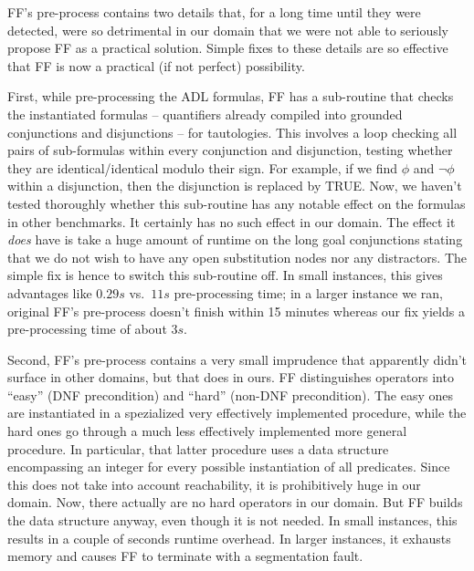 FF's pre-process contains two details that, for a long time until they
were detected, were so detrimental in our domain that we were not able
to seriously propose FF as a practical solution. Simple fixes to these
details are so effective that FF is now a practical (if not perfect)
possibility.



First, while pre-processing the ADL formulas, FF has a sub-routine
that checks the instantiated formulas -- quantifiers already compiled
into grounded conjunctions and disjunctions -- for tautologies. This
involves a loop checking all pairs of sub-formulas within every
conjunction and disjunction, testing whether they are
identical/identical modulo their sign. For example, if we find $\phi$
and $\neg \phi$ within a disjunction, then the disjunction is replaced
by TRUE. Now, we haven't tested thoroughly whether this sub-routine
has any notable effect on the formulas in other benchmarks. It
certainly has no such effect in our domain. The effect it {\em does}
have is take a huge amount of runtime on the long goal conjunctions
stating that we do not wish to have any open substitution nodes nor
any distractors. The simple fix is hence to switch this sub-routine
off. In small instances, this gives advantages like $0.29s$ vs.\ $11s$
pre-processing time; in a larger instance we ran, original FF's
pre-process doesn't finish within 15 minutes whereas our fix yields a
pre-processing time of about $3s$.


Second, FF's pre-process contains a very small imprudence that
apparently didn't surface in other domains, but that does in ours. FF
distinguishes operators into ``easy'' (DNF precondition) and ``hard''
(non-DNF precondition). The easy ones are instantiated in a
spezialized very effectively implemented procedure, while the hard
ones go through a much less effectively implemented more general
procedure. In particular, that latter procedure uses a data structure
encompassing an integer for every possible instantiation of all
predicates. Since this does not take into account reachability, it is
prohibitively huge in our domain. Now, there actually are no hard
operators in our domain. But FF builds the data structure anyway, even
though it is not needed. In small instances, this results in a couple
of seconds runtime overhead. In larger instances, it exhausts memory
and causes FF to terminate with a segmentation fault.




















